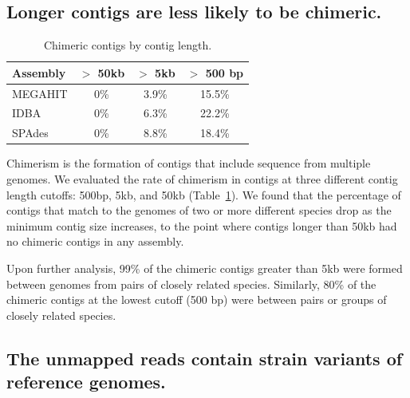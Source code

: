 \documentclass[10pt,a4paper,twocolumn]{article}
\begin{document}
\subsection*{Longer contigs are less likely to be chimeric.}

\begin{table}[!h]
\centering
\caption{Chimeric contigs by contig length.}
\begin{tabular}{|l|c|c|c|}\hline
\textbf{Assembly} & \textbf {$>$ 50kb} & \textbf {$>$ 5kb} & \textbf{$>$ 500 bp}
\\ \hline

MEGAHIT      & 0\% & 3.9\% & 15.5\% \\ 
IDBA   & 0\% & 6.3\% & 22.2\% \\
SPAdes    & 0\% & 8.8\% & 18.4\% \\
\hline

\end{tabular}
\label{table:contig-chimera}

\end{table}

Chimerism is the formation of contigs that include sequence from multiple
genomes.
We evaluated the rate of chimerism
in contigs at three different contig length cutoffs: 500bp, 5kb,
and 50kb (Table~\ref{table:contig-chimera}).  We found that the
percentage of contigs that match to the genomes of two or more
different species drop as the minimum contig size increases, to the
point where contigs longer than 50kb had no chimeric contigs in any
assembly.


Upon further analysis, 99\% of the chimeric contigs greater than 5kb
were formed between genomes from pairs of closely related species.
Similarly, 80\% of the chimeric contigs at the lowest cutoff (500 bp)
were between pairs or groups of closely related species.



\subsection*{The unmapped reads contain strain variants of reference genomes.}

\end{document}
